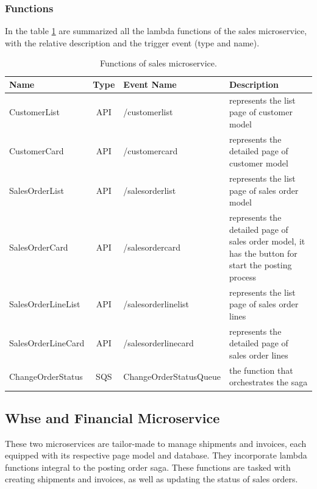 \subsubsection{Functions}
In the table \ref{tab:5_sales_functions} are summarized all the lambda functions of the sales
microservice, with the relative description and the trigger event (type and name).

\begin{table}
    \centering
    \begin{tabular}{|l|c|l|m{4.3cm}|}
        \hline
        \textbf{Name}      & \textbf{Type} & \textbf{Event Name}    & \textbf{Description}                                                                               \\ \hline
        CustomerList       & API           & /customerlist          & represents the list page of customer model                                                         \\ \hline
        CustomerCard       & API           & /customercard          & represents the detailed page of customer model                                                     \\ \hline
        SalesOrderList     & API           & /salesorderlist        & represents the list page of sales order model                                                      \\ \hline
        SalesOrderCard     & API           & /salesordercard        & represents the detailed page of sales order model, it has the button for start the posting process \\ \hline
        SalesOrderLineList & API           & /salesorderlinelist    & represents the list page of sales order lines                                                      \\ \hline
        SalesOrderLineCard & API           & /salesorderlinecard    & represents the detailed page of sales order lines                                                  \\ \hline
        ChangeOrderStatus  & SQS           & ChangeOrderStatusQueue & the function that orchestrates the saga                                                            \\ \hline
    \end{tabular}
    \caption{Functions of sales microservice.}
    \label{tab:5_sales_functions}
\end{table}


\subsection{Whse and Financial Microservice}
These two microservices are tailor-made to manage shipments and invoices, each equipped with its
respective page model and database. They incorporate lambda functions integral to the posting order
saga. These functions are tasked with creating shipments and invoices, as well as updating the
status of sales orders.

